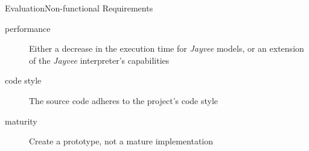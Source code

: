 \begin{frame}[t]{Evaluation}{Non-functional Requirements}
	\begin{description}
		\item[performance] Either a decrease in the execution time for \emph{Jayvee} models, or an extension of the \emph{Jayvee} interpreter's capabilities \uncover<2->{({\color{green} \checkmark})}
		\item[code style] The source code adheres to the project's code style \uncover<3->{({\color{green} \checkmark})}
		\item[maturity] Create a prototype, not a mature implementation \uncover<4->{({\color{green} \checkmark})}
	\end{description}
\end{frame}

